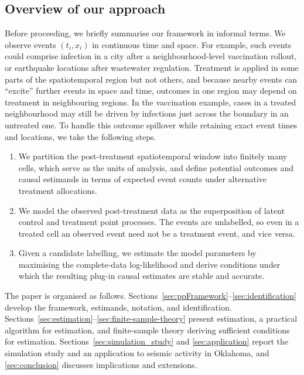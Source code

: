 \documentclass{statsoc}
\newcommand{\1}{\mathbbm{1}}
\begin{document}
\subsection{Overview of our approach}

Before proceeding, we briefly summarise our framework in informal terms. We observe events $(t_i,x_i)$ in continuous time and space. For example, such events could comprise infection in a city after a neighbourhood-level vaccination rollout, or earthquake locations after wastewater regulation. Treatment is applied in some parts of the spatiotemporal region but not others, and because nearby events can ``excite'' further events in space and time, outcomes in one region may depend on treatment in neighbouring regions. In the vaccination example, cases in a treated neighbourhood may still be driven by infections just across the boundary in an untreated one. To handle this outcome spillover while retaining exact event times and locations, we take the following steps.
\begin{enumerate}[label=(\roman*), nosep]
    \item We partition the post-treatment spatiotemporal window into finitely many cells, which serve as the units of analysis, and define potential outcomes and causal estimands in terms of expected event counts under alternative treatment allocations.
    \item We model the observed post-treatment data as the superposition of latent control and treatment point processes. The events are unlabelled, so even in a treated cell an observed event need not be a treatment event, and vice versa.
    \item Given a candidate labelling, we estimate the model parameters by maximising the complete-data log-likelihood and derive conditions under which the resulting plug-in causal estimates are stable and accurate.
\end{enumerate}

The paper is organised as follows. Sections~\ref{sec:ppFramework}--\ref{sec:identification} develop the framework, estimands, notation, and identification. Sections~\ref{sec:estimation}--\ref{sec:finite-sample-theory} present estimation, a practical algorithm for estimation, and finite-sample theory deriving sufficient conditions for estimation. Sections~\ref{sec:simulation_study} and \ref{sec:application} report the simulation study and an application to seismic activity in Oklahoma, and \cref{sec:conclusion} discusses implications and extensions.
\end{document}
